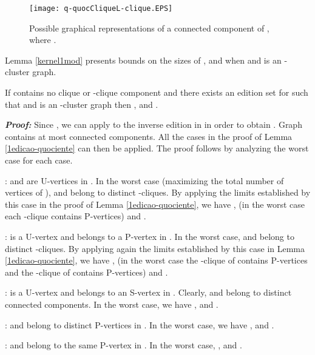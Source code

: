 \documentclass[12pt]{article}
\begin{document}
\begin{figure}[htb]
\centering
\texttt{[image: q-quocCliqueL-clique.EPS]}
\caption{\label{q-quocCliqueBiclique}Possible graphical
representations of a connected component of ,
where .}
\end{figure}

Lemma \ref{kernel1mod} presents bounds on the sizes of ,
 and  when  and 
is an -cluster graph.



\begin{lema} \label{kernel1mod}
If  contains no clique or -clique component and there
exists an edition set  for  such that  and
 is an -cluster graph then ,  and
.
\end{lema}


\emph{\textbf{Proof:}} Since , we can apply to  the inverse
edition in  in order to obtain . Graph 
contains at most  connected components. All the cases in the
proof of Lemma \ref{1edicao-quociente} can then be applied.
The proof follows by analyzing the worst case for each case.

\medskip

:  and  are U-vertices in . In the worst case (maximizing the total number of vertices of ),  and  belong to distinct -cliques. By applying the limits established by this case in the proof of Lemma \ref{1edicao-quociente}, we have  ,    (in the worst case each -clique contains  P-vertices) and .

\medskip

:  is a U-vertex and  belongs to a P-vertex in . In the worst case,  and  belong to distinct -cliques. By applying again the limits established by this case in Lemma \ref{1edicao-quociente}, we have ,  (in the worst case the -clique of  contains  P-vertices and the -clique of  contains  P-vertices) and .

\medskip

:  is a U-vertex and  belongs to an S-vertex in . Clearly,  and  belong to distinct connected components. In the worst case, we have ,  and .

\medskip

:  and  belong to distinct P-vertices in . In the worst case, we have ,  and .

\medskip

:  and  belong to the same P-vertex in . In the worst case, ,  and .
\end{document}
